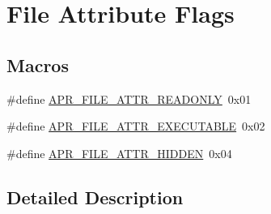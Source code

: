 \hypertarget{group__apr__file__attrs__set__flags}{\section{File Attribute Flags}
\label{group__apr__file__attrs__set__flags}
}
\subsection*{Macros}
\begin{DoxyCompactItemize}
\item 
\#define \hyperlink{group__apr__file__attrs__set__flags_ga333f2c798495cfb95ee624e11c862e38}{A\-P\-R\-\_\-\-F\-I\-L\-E\-\_\-\-A\-T\-T\-R\-\_\-\-R\-E\-A\-D\-O\-N\-L\-Y}~0x01
\item 
\#define \hyperlink{group__apr__file__attrs__set__flags_ga51346f433e354f0bc8722388b6b275fd}{A\-P\-R\-\_\-\-F\-I\-L\-E\-\_\-\-A\-T\-T\-R\-\_\-\-E\-X\-E\-C\-U\-T\-A\-B\-L\-E}~0x02
\item 
\#define \hyperlink{group__apr__file__attrs__set__flags_ga68c188c0e56b9abdef3c97ffd913c5aa}{A\-P\-R\-\_\-\-F\-I\-L\-E\-\_\-\-A\-T\-T\-R\-\_\-\-H\-I\-D\-D\-E\-N}~0x04
\end{DoxyCompactItemize}


\subsection{Detailed Description}



